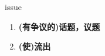 
\begin{frame}
{\huge issue}
\begin{center}
\begin{enumerate}\Large
  \item \textbf{(有争议的)话题，议题}
  \item \textbf{(使)流出}
\end{enumerate}
\end{center}
\end{frame}
